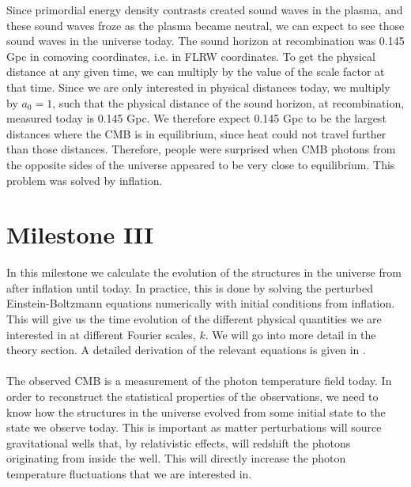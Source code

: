 \documentclass{aa}
\begin{document}
Since primordial energy density contrasts created sound waves in the plasma, and these sound waves froze as the plasma became neutral, we can expect to see those sound 
waves in the universe today. The sound horizon at recombination was 0.145 Gpc in comoving coordinates, i.e. in FLRW coordinates. To get the physical distance at any given time, we
can multiply by the value of the scale factor at that time. Since we are only interested in physical distances today, we multiply by $a_0 =1$, such that the physical distance
of the sound horizon, at recombination, measured today is 0.145 Gpc. We therefore expect 0.145 Gpc to be the largest distances where the CMB is in equilibrium,
since heat could not travel further than those distances. Therefore, people were surprised when CMB photons from the opposite sides of the universe appeared to be very close to equilibrium. This problem was solved by inflation.  




\section{Milestone III}
In this milestone we calculate the evolution of the structures in the universe from after inflation until today.  In practice, this is done by 
solving the perturbed Einstein-Boltzmann equations numerically with initial conditions from inflation. This will give us the time evolution of the different physical quantities we are interested
in at different Fourier scales, $k$. We will go into more detail in the theory section. A detailed derivation of the relevant equations is given in \cite{winther:2023}. \\
\\
The observed CMB is a measurement of the photon temperature field today. In order to reconstruct the statistical properties of the observations, we need
to know how the structures in the universe evolved from some initial state to the state we observe today. This is important as matter perturbations will source gravitational
wells that, by relativistic effects, will redshift the photons originating from inside the well. This will directly increase the photon temperature fluctuations that we are interested in.   
\end{document}
